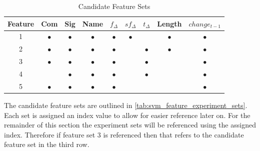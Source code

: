 \begin{table}[ht]
\begin{center}

    \begin{tabular}{|c|c|c|c|c|c|c|c|c|}
        \hline
        Feature & Com & Sig & Name & $f_{\Delta}$ & $sf_{\Delta}$ & $t_\Delta$ & Length & $change_{t-1}$ \\
         \hline
        1 & $\bullet$ & $\bullet$ & $\bullet$ & $\bullet$ & $\bullet$ & & $\bullet$ & $\bullet$ \\
        2 & $\bullet$ & $\bullet$ & $\bullet$ & $\bullet$ & & $\bullet$ & $\bullet$ & $\bullet$ \\
        3 & $\bullet$ & $\bullet$ & $\bullet$ & $\bullet$ & & $\bullet$ & & $\bullet$ \\
        4 & & $\bullet$ & $\bullet$ & $\bullet$ & & $\bullet$ & & $\bullet$ \\
        5 & $\bullet$ & $\bullet$ & $\bullet$ & $\bullet$ & & & & $\bullet$ \\ \hline
    \end{tabular}
    \caption{Candidate Feature Sets}
    \label{tab:svm_feature_experiment_sets}
\end{center}
\end{table}

The candidate feature sets are outlined in \autoref{tab:svm_feature_experiment_sets}. Each set is assigned an index value to allow for easier reference later on. For the remainder of this section the experiment sets will be referenced using the assigned index. Therefore if feature set 3 is referenced then that refers to the candidate feature set in the third row.



